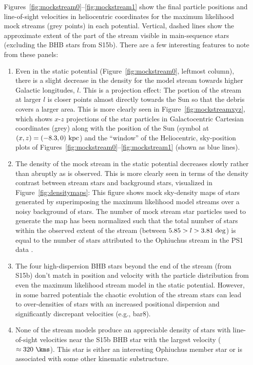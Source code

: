 \documentclass[letterpaper,12pt,preprint]{aastex}
\begin{document}
Figures~\ref{fig:mockstream0}--\ref{fig:mockstream1} show the final particle positions and line-of-sight velocities in heliocentric coordinates for the maximum likelihood mock streams (grey points) in each potential. Vertical, dashed lines show the approximate extent of the part of the stream visible in main-sequence stars (excluding the BHB stars from S15b). There are a few interesting features to note from these panels: 
\begin{enumerate}
	\item Even in the static potential (Figure~\ref{fig:mockstream0}, leftmost column), there is a slight decrease in the density for the model stream towards higher Galactic longitudes, $l$. This is a projection effect: The portion of the stream at larger $l$ is closer points almost directly towards the Sun so that the debris covers a larger area. This is more clearly seen in Figure~\ref{fig:mockstreamxyz}, which shows $x$-$z$ projections of the star particles in Galactocentric Cartesian coordinates (grey) along with the position of the Sun (symbol at $(x,z)=(-8.3,0)~{\rm kpc}$) and the ``window'' of the Heliocentric, sky-position plots of Figures~\ref{fig:mockstream0}--\ref{fig:mockstream1} (shown as blue lines).
	\item The density of the mock stream in the static potential decreases slowly rather than abruptly as is observed. This is more clearly seen in terms of the density contrast between stream stars and background stars, visualized in Figure~\ref{fig:densitymaps}: This figure shows mock sky-density maps of stars generated by superimposing the maximum likelihood model streams over a noisy background of stars. The number of mock stream star particles used to generate the map has been normalized such that the total number of stars within the observed extent of the stream (between $5.85 > l > 3.81~{\rm deg}$) is equal to the number of stars attributed to the Ophiuchus stream in the PS1 data \citep[$N \approx 500$][]{bernard14}.
	\item The four high-dispersion BHB stars beyond the end of the stream (from S15b) don't match in position and velocity with the particle distribution from even the maximum likelihood stream model in the static potential. However, in some barred potentials the chaotic evolution of the stream stars can lead to over-densities of stars with an increased positional dispersion and significantly discrepant velocities (e.g., bar8).
	\item None of the stream models produce an appreciable density of stars with line-of-sight velocities near the S15b BHB star with the largest velocity ($\approx 320~\kms$). This star is either an interesting Ophiuchus member star or is associated with some other kinematic substructure.

\end{enumerate}
\end{document}
